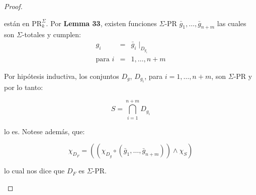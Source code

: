 \begin{proof}
\begin{enumerate}
        \PN están en $\mathrm{PR}_{k}^{\Sigma}$. Por \textbf{Lemma 33}, existen funciones $\Sigma$-PR $\bar{g}_{1},
        \dotsc, \bar{g}_{n+m}$ las cuales son $\Sigma$-totales y cumplen:
        \begin{eqnarray*}
          g_{i} &=& \bar{g}_{i} \mid_{D_{g_{i}}} \\
          \text{para } i &=& 1, \dotsc, n + m
        \end{eqnarray*}

        \PN Por hipótesis inductiva, los conjuntos $D_{g}$, $D_{g_{i}}$, para $i = 1, \dotsc, n + m$, son $\Sigma$-PR y
        por lo tanto:

        \[
          S = \bigcap_{i=1}^{n+m} D_{g_{i}}
        \]

        \PN lo es. Notese además, que:

        \[
          \chi_{D_{F}} = \left((\chi_{D_{g}} \circ (\bar{g}_{1}, \dotsc, \bar{g}_{n+m})) \wedge \chi_{S}\right)
        \]

        \PN lo cual nos dice que $D_{F}$ es $\Sigma$-PR.
    \end{enumerate}
  \end{proof}
